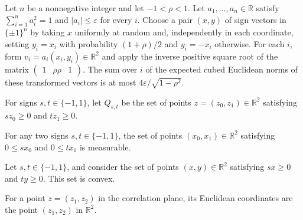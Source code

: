 \begin{theorem}
\label{FABL.sum_integral_regularThresholdPairSummand_whitening_cube_le}
\leanok
{}
Let $n$ be a nonnegative integer and let $-1<\rho<1$. Let $a_1,\ldots,a_n\in\mathbb
R$ satisfy $\sum_{i=1}^n a_i^2=1$ and $|a_i|\le\varepsilon$ for every $i$. Choose a
pair $(x,y)$ of sign vectors in $\{\pm1\}^n$ by taking $x$ uniformly at random and,
independently in each coordinate, setting $y_i=x_i$ with probability $(1+\rho)/2$ and
$y_i=-x_i$ otherwise. For each $i$, form $v_i=a_i(x_i,y_i)\in\mathbb R^2$ and apply
the inverse positive square root of the matrix
$\begin{pmatrix}1&\rho\rho&1\end{pmatrix}$. The sum over $i$ of the expected
cubed Euclidean norms of these transformed vectors is at most
$4\varepsilon/\sqrt{1-\rho^2}$.
\end{theorem}

\begin{definition}
\label{FABL.signQuadrant}
\leanok
{}
For signs $s,t\in\{-1,1\}$, let $Q_{s,t}$ be the set of points
$z=(z_0,z_1)\in\mathbb{R}^2$ satisfying $s z_0\ge 0$ and $t z_1\ge 0$.
\end{definition}

\begin{theorem}
\label{FABL.measurableSet_signQuadrant}
\leanok
{}
For any two signs $s,t\in\{−1,1\}$, the set of points $(x_0,x_1)\in\mathbb R^2$
satisfying $0\le s x_0$ and $0\le t x_1$ is measurable.
\end{theorem}

\begin{theorem}
\label{FABL.isConvexSet_signQuadrant}
\leanok
{}
Let $s,t\in\{-1,1\}$, and consider the set of points $(x,y)\in\mathbb R^2$ satisfying
$sx\ge 0$ and $ty\ge 0$. This set is convex.
\end{theorem}

\begin{definition}
\label{FABL.correlationEuclideanCoordinates}
\leanok
{}
For a point $z=(z_1,z_2)$ in the correlation plane, its Euclidean coordinates are the
point $(z_1,z_2)$ in $\mathbb{R}^2$.
\end{definition}

